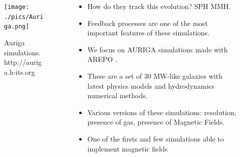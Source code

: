 \documentclass[xcolor=dvipsnames]{beamer}
\begin{document}
\begin{frame}

\begin{columns}[c]

\begin{column}{.5\textwidth}
\begin{figure}
\texttt{[image: ./pics/Auriga.png]}
\caption{\tiny Auriga simulations. http://auriga.h-its.org}
\end{figure}
\end{column}

\begin{column}{.6\textwidth}
\centering
\footnotesize
\begin{itemize}

\item How do they track this evolution? SPH MMH.
\item Feedback processes are one of the most important features of these simulations.
\item We focus on AURIGA \cite{auriga} simulations made with AREPO \cite{arepo}.
\item These are a set of 30 MW-like galaxies with latest physics models and hydrodynamics numerical methods.
\item Various versions of these simulations: resolution, presence of gas, presence of Magnetic Fields.
\item One of the firsts and few simulations able to implement magnetic fields

\end{itemize}

\end{column}

\end{columns}

\end{frame}

\end{document}
